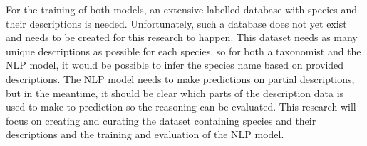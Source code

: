 \documentclass[a4paper, 12pt, oneside]{book} %
\begin{document}
For the training of both models, an extensive labelled database with species and their descriptions is needed. 
Unfortunately, such a database does not yet exist and needs to be created for this research to happen.
This dataset needs as many unique descriptions as possible for each species, so for both a taxonomist and the NLP model, it would be possible to infer the species name based on provided descriptions.
The NLP model needs to make predictions on partial descriptions, but in the meantime, it should be clear which parts of the description data is used to make to prediction so the reasoning can be evaluated.
This research will focus on creating and curating the dataset containing species and their descriptions and the training and evaluation of the NLP model.

\end{document}
